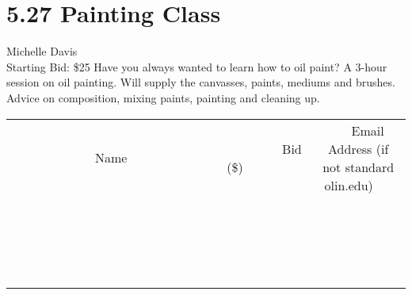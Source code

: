 \documentclass[11pt]{article}
\begin{document}
\section*{5.27 Painting Class}
Michelle Davis
\\
Starting Bid: \$25
\newline
Have you always wanted to learn how to oil paint? A 3-hour session on oil painting. Will supply the canvasses, paints, mediums and brushes. Advice on composition, mixing paints, painting and cleaning up.
\\[3ex]
\begin{tabular}{c c c}
~~~~~~~~~~~~~Name~~~~~~~~~~~~~ & ~~~~~~~~~Bid (\$)~~~~~~~~~  & ~~~Email Address (if not standard olin.edu)~~~\\
 & & \\
\hline
 & & \\
\hline
 & & \\
\hline
 & & \\
\hline
 & & \\
\hline
 & & \\
\hline
 & & \\
\hline
 & & \\
\hline
 & & \\
\hline
 & & \\
\hline
 & & \\
\hline
 & & \\
\hline
 & & \\
\hline
 & & \\
\hline
 & & \\
\hline
 & & \\
\hline
 & & \\
\hline
 & & \\
\hline
 & & \\
\hline
\end{tabular}
\newpage
\end{document}
